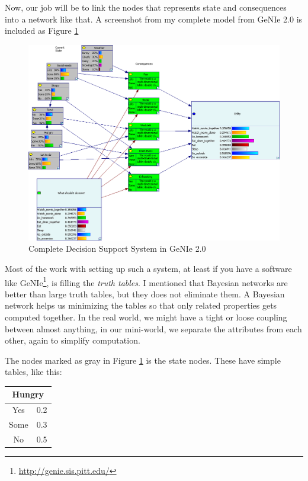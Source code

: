 Now, our job will be to link the nodes that represents state and consequences
into a network like that. A screenshot from my complete model from GeNIe 2.0
is included as Figure \ref{fig:complete} \begin{figure}[h]
\includegraphics[width=154mm]{figure-complete.png}
\caption{Complete Decision Support System in GeNIe 2.0}
\label{fig:complete}
\end{figure}

Most of the work with setting up such a system, at least if you have a software
like GeNIe\footnote{\url{http://genie.sis.pitt.edu/}}, is filling the
\emph{truth tables}. I mentioned that Bayesian networks are better than large
truth tables, but they does not eliminate them. A Bayesian network helps us minimizing the tables so that only related
properties gets computed together. In the real world, we might have a tight or
loose coupling between almost anything, in our mini-world, we separate the
attributes from each other, again to simplify computation.


The nodes marked as gray in Figure \ref{fig:complete} is the state nodes. These
have simple tables, like this:

\begin{tabular}{|c|c|}
\hline
\multicolumn{2}{|c|}{Hungry}\\
\hline
Yes & 0.2\\
Some & 0.3\\
No & 0.5\\
\hline
\end{tabular}

